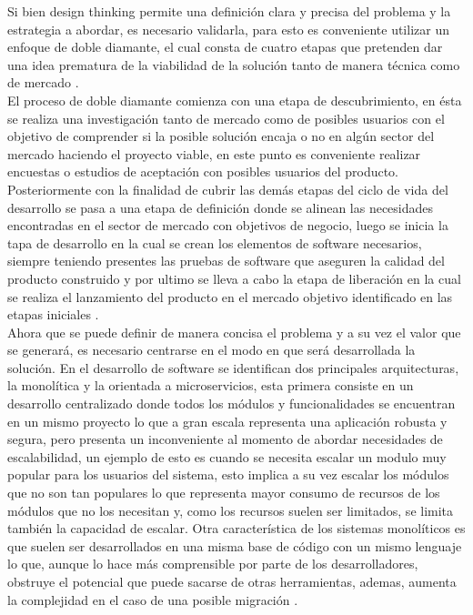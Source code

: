 Si bien design thinking permite una definición clara y precisa del problema y la estrategia a abordar, es necesario validarla, para esto es conveniente utilizar un enfoque de doble diamante, el cual consta de  cuatro etapas que pretenden dar una idea prematura de la viabilidad de la solución tanto de manera técnica como de mercado \cite{Clune2014}.\\

El proceso de doble diamante comienza con una etapa de descubrimiento, en ésta se realiza una investigación tanto de mercado como de posibles usuarios con el objetivo de comprender si la posible solución encaja o no en algún sector del mercado haciendo el proyecto viable, en este punto es conveniente realizar encuestas o estudios de aceptación con posibles usuarios del producto. Posteriormente con la finalidad de cubrir las demás etapas del ciclo de vida del desarrollo  se pasa a una etapa de definición donde se alinean las necesidades encontradas en el sector de mercado con objetivos de negocio, luego se inicia la tapa de desarrollo en la cual se crean los elementos de software necesarios, siempre teniendo presentes las pruebas de software que aseguren la calidad del producto construido y por ultimo se lleva a cabo la etapa de liberación en la cual se realiza el lanzamiento del producto en el mercado objetivo identificado en las etapas iniciales \cite{DesignCouncil}.\\

Ahora que se puede definir de manera concisa el problema y a su vez el valor que se generará, es necesario centrarse en el modo en que será desarrollada la solución. En el desarrollo de software se identifican dos principales arquitecturas, la monolítica y la orientada a microservicios, esta primera consiste en un desarrollo centralizado donde todos los módulos y funcionalidades se encuentran en un mismo proyecto lo que a gran escala representa una aplicación robusta y segura, pero presenta un inconveniente al momento de abordar necesidades de escalabilidad, un ejemplo de esto es cuando se necesita escalar un modulo muy popular para los usuarios del sistema, esto implica a su vez escalar los módulos que no son tan populares lo que representa mayor consumo de recursos de los módulos que no los necesitan y, como los recursos suelen ser limitados, se limita también la capacidad de escalar. Otra característica de los sistemas monolíticos es que suelen ser desarrollados en una misma base de código con un mismo lenguaje lo que, aunque lo hace más comprensible por parte de los desarrolladores, obstruye el potencial que puede sacarse de otras herramientas, ademas, aumenta la complejidad en el caso de una posible migración \cite{Villamizar2015}.\\


